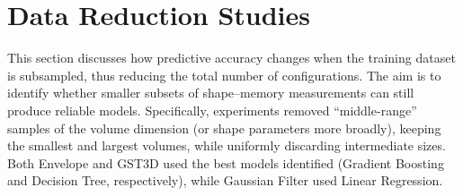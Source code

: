 
\section{Data Reduction Studies}
\label{sec:pmc-results-data-reduction-studies}


This section discusses how predictive accuracy changes when the training dataset is subsampled, thus reducing the total number of configurations.
The aim is to identify whether smaller subsets of shape–memory measurements can still produce reliable models.
Specifically, experiments removed “middle-range” samples of the volume dimension (or shape parameters more broadly), keeping the smallest and largest volumes, while uniformly discarding intermediate sizes.
Both Envelope and \ac{GST3D} used the best models identified (Gradient Boosting and Decision Tree, respectively), while Gaussian Filter used Linear Regression.

